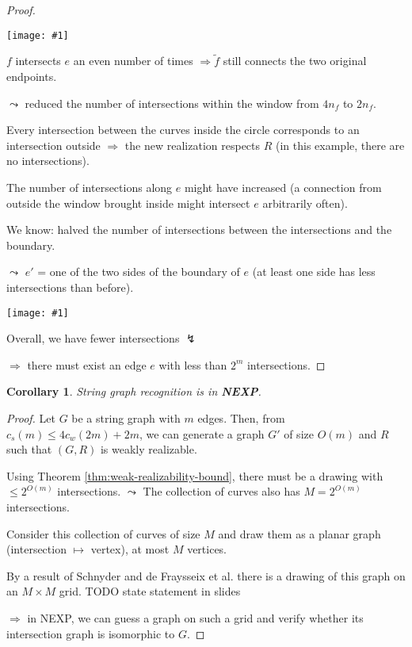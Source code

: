 \documentclass[12pt]{article}
\theoremstyle{plain} %
\newtheorem{corollary}[theorem]{Corollary}
\newcommand{\image}[1]{\begin{center}\texttt{[image: \#1]}\end{center}}
\begin{document}
\begin{proof}
\image{images/figure-9.jpeg}

\(f\) intersects \(e\) an even number of times \(\Rightarrow \tilde{f}\) still connects the two original endpoints.

\(\leadsto\) reduced the number of intersections within the window from \(4 n_f\) 
to \(2 n_f\).

Every intersection between the curves inside the circle corresponds to an intersection 
outside \(\Rightarrow\) the new realization respects \(R\) (in this example, there are no intersections).

The number of intersections along \(e\) might have increased (a connection from outside the window brought inside might intersect \(e\) arbitrarily often).

We know: halved the number of intersections between the intersections and the boundary. 

\(\leadsto\) \(e'\) = one of the two sides of the boundary of \(e\)
(at least one side has less intersections than before).

\image{images/figure-10.jpeg}

Overall, we have fewer intersections \(\lightning\)

\(\Rightarrow\) there must exist an edge \(e\) with less than \(2^m\) intersections.
\end{proof}

\begin{corollary}
    String graph recognition is in \textbf{NEXP}.
\end{corollary}

\begin{proof}
Let \(G\) be a string graph with \(m\) edges. 
Then, from \(c_s(m) \leq 4 c_w(2m) + 2m\), we can generate a graph \(G'\) of size \(O(m)\) and \(R\) such that 
\((G, R)\) is weakly realizable. 

Using Theorem \ref{thm:weak-realizability-bound}, there must be a drawing with \(\leq 2^{O(m)}\) intersections.
\(\leadsto\) The collection of curves also has \(M = 2^{O(m)}\) intersections.

Consider this collection of curves of size \(M\) and draw them as a planar graph (intersection \(\mapsto\) vertex), 
at most \(M\) vertices.

By a result of Schnyder and de Fraysseix et al. there is a drawing of this graph on an \(M \times M\) grid.
TODO state statement in slides

\(\Rightarrow\) in NEXP, we can guess a graph on such a grid and verify whether its intersection graph is isomorphic to \(G\).
\end{proof}
\end{document}
